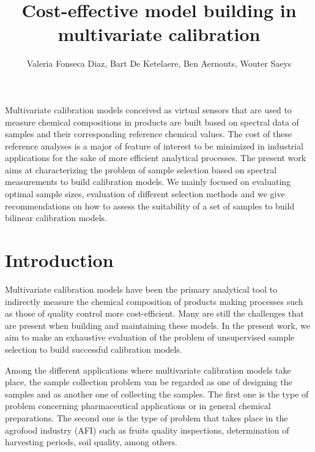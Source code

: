 \documentclass{article}
\renewenvironment{abstract}
  {{\bfseries\noindent{\abstractname}\par\nobreak}\footnotesize}
  {\bigskip}
\begin{document}
\title{Cost-effective model building in multivariate calibration}


\author[ ]{Valeria Fonseca Diaz, Bart De Ketelaere, Ben Aernouts, Wouter Saeys}

\affil[ ]{}
\vspace{-1em}


\date{}

\begingroup
\let\center\flushleft
\let\endcenter\endflushleft
\maketitle
\endgroup

\begin{abstract}
{
Multivariate calibration models conceived as virtual sensors that are used to measure chemical compositions in products are built based on spectral data of samples and their corresponding reference chemical values. The cost of these reference analyses is a major of feature of interest to be minimized in industrial applications for the sake of more efficient analytical processes. The present work aims at characterizing the problem of sample selection based on spectral measurements to build calibration models. We mainly focused on evaluating optimal sample sizes, evaluation of different selection methods and we give recommendations on how to assess the suitability of a set of samples to build bilinear calibration models.
}\\%
\end{abstract}%


\section*{Introduction}\label{introduction}

Multivariate calibration models have been the primary analytical tool to indirectly measure the chemical composition of products making processes such as those of quality control more cost-efficient. Many are still the challenges that are present when building and maintaining these models. In the present work, we aim to make an exhaustive evaluation of the problem of unsupervised sample selection to build successful calibration models. 

Among the different applications where multivariate calibration models take place, the sample collection problem van be regarded as one of designing the samples and as another one of collecting the samples. The first one is the type of problem concerning pharmaceutical applications or in general chemical preparations. The second one is the type of problem that takes place in the agrofood industry (AFI) such as fruits quality inspections, determination of harvesting periods, soil quality, among others. 
\end{document}
